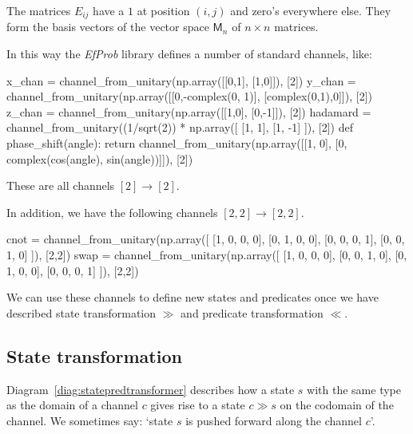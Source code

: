 \documentclass[leqno]{tufte-book} %
\newcommand{\EfProb}{\textit{EfProb}\xspace}
\newcommand{\Mat}{\mathsf{M}}
\begin{document}
\noindent The matrices $E_{ij}$ have a $1$ at position $(i,j)$ and
zero's everywhere else. They form the basis vectors of the vector
space $\Mat_{n}$ of $n\times n$ matrices.

In this way the \EfProb library defines a number of standard
channels, like:
\begin{python}
x_chan = channel_from_unitary(np.array([[0,1],
                                        [1,0]]), [2])
y_chan = channel_from_unitary(np.array([[0,-complex(0, 1)],
                                        [complex(0,1),0]]), [2])
z_chan = channel_from_unitary(np.array([[1,0],
                                        [0,-1]]), [2])
hadamard = channel_from_unitary((1/sqrt(2)) * np.array([ [1, 1],
                                                              [1, -1] ]), [2])
def phase_shift(angle):
    return channel_from_unitary(np.array([[1, 0],
                                          [0, complex(cos(angle),
                                                      sin(angle))]]), [2])
\end{python}

\noindent These are all channels $[2] \rightarrow [2]$.

In addition, we have the following channels $[2,2] \rightarrow [2,2]$.
\begin{python}
cnot = channel_from_unitary(np.array([ [1, 0, 0, 0],
                                       [0, 1, 0, 0],
                                       [0, 0, 0, 1],
                                       [0, 0, 1, 0] ]), [2,2])
swap = channel_from_unitary(np.array([ [1, 0, 0, 0],
                                       [0, 0, 1, 0],
                                       [0, 1, 0, 0],
                                       [0, 0, 0, 1] ]), [2,2])
\end{python}

\noindent We can use these channels to define new states and
predicates once we have described state transformation $\gg$ and
predicate transformation $\ll$.


\subsection{State transformation}\label{subsec:qchannel:statetransform}

Diagram~\eqref{diag:statepredtransformer} describes how a state $s$
with the same type as the domain of a channel $c$ gives rise to a
state $c \gg s$ on the codomain of the channel. We sometimes say:
`state $s$ is pushed forward along the channel $c$'.
\end{document}
